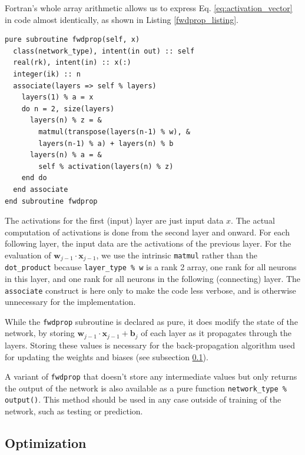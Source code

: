 \documentclass[sigplan, review=false, screen=true, balance=true]{acmart}
\begin{document}
Fortran's whole array arithmetic allows us to express Eq. \ref{eq:activation_vector}
in code almost identically, as shown in Listing \ref{fwdprop_listing}.

\begin{minipage}{\linewidth}
\begin{lstlisting}[caption={A subroutine to perform the forward propagation of the network, and store intermediate activations for later use.}, captionpos=b, label={fwdprop_listing}]
pure subroutine fwdprop(self, x)
  class(network_type), intent(in out) :: self
  real(rk), intent(in) :: x(:)
  integer(ik) :: n
  associate(layers => self % layers)
    layers(1) % a = x
    do n = 2, size(layers)
      layers(n) % z = &
        matmul(transpose(layers(n-1) % w), &
        layers(n-1) % a) + layers(n) % b
      layers(n) % a = &
        self % activation(layers(n) % z)
    end do
  end associate
end subroutine fwdprop
\end{lstlisting}
\end{minipage}

The activations for the first (input) layer are just input data $x$. The actual
computation of activations is done from the second layer and onward. For each
following layer, the input data are the activations of the previous layer.
For the evaluation of $\mathbf{w}_{j-1} \cdot \mathbf{x}_{j-1}$, we use
the intrinsic \lstinline{matmul} rather than the \lstinline{dot_product}
because \lstinline{layer_type % w} is a rank 2 array, one rank for all neurons
in this layer, and one rank for all neurons in the following (connecting) layer.
The \lstinline{associate} construct is here only to make the code
less verbose, and is otherwise unnecessary for the implementation.

While the \lstinline{fwdprop} subroutine is declared as pure, it does modify
the state of the network, by storing $\mathbf{w}_{j-1} \cdot \mathbf{x}_{j-1} + \mathbf{b}_j$
of each layer as it propagates through the layers. Storing these values is
necessary for the back-propagation algorithm used for updating the weights and
biases (see subsection \ref{backprop}).

A variant of \lstinline{fwdprop} that doesn't store any intermediate values
but only returns the output of the network is also available as a pure function
\lstinline{network_type % output()}. This method should be used in any case outside
of training of the network, such as testing or prediction.

\subsection{Optimization} \label{backprop}
\end{document}
